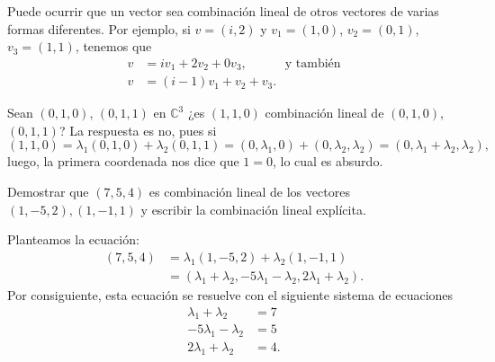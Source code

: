 \documentclass{beamer} %
\newcommand{\C}{\mathbb C}
\begin{document}
\begin{frame}

\begin{ejemplo}
    Puede ocurrir que un vector sea combinación lineal de otros vectores de varias formas diferentes. Por ejemplo,   si   $v = (i,2)$ y $v_1 = (1,0)$, $v_2 = (0,1)$, $v_3 = (1,1)$,  tenemos que
        \begin{align*}
            v &= iv_1+2v_2+0v_3,\quad\quad\quad\text{y también}\\
            v &= (i-1)v_1 + v_2 + v_3.  
        \end{align*}
\end{ejemplo}
\pause
\begin{ejemplo}
        Sean $(0,1,0)$, $(0,1,1)$ en $\C^3$ ¿es $(1,1,0)$ combinación lineal de $(0,1,0)$, $(0,1,1)$? La respuesta es no, pues si 
        $$
        (1,1,0) = \lambda_1(0,1,0)+ \lambda_2(0,1,1) = (0,\lambda_1,0)+ (0,\lambda_2,\lambda_2) = (0,\lambda_1+\lambda_2,\lambda_2),
        $$ 
        luego, la primera coordenada nos dice que $1=0$, lo cual es absurdo. 
        
\end{ejemplo}
    
    
\end{frame}


\begin{frame}
    \begin{ejemplo}\label{vector-en-subespacio}
        Demostrar que $(7, 5, 4)$  es combinación lineal de los vectores $(1,-5,2), (1,-1,1)$ y escribir la combinación lineal explícita.
    \end{ejemplo} 
    
    \begin{solucion}
        
    
    Planteamos la ecuación:
    \begin{align*}
        (7, 5, 4) &= \lambda_1(1,-5,2)+\lambda_2 (1,-1,1)
        \\
        &= (\lambda_1+\lambda_2,-5\lambda_1-\lambda_2,2\lambda_1+\lambda_2).
    \end{align*}
    Por consiguiente,  esta ecuación se resuelve con el siguiente sistema de ecuaciones
    \begin{align*}
        \lambda_1+\lambda_2 &= 7 \\
        -5\lambda_1-\lambda_2&= 5 \\
        2\lambda_1+\lambda_2 &= 4.
    \end{align*}

    \end{solucion}
    \end{frame}
\end{document}
